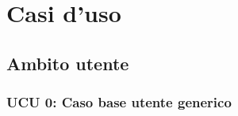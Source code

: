 \section{Casi d'uso}

\iffalse  %
\paragraph{UC 1:}
\begin{itemize}
\item \textbf{Attori:} utente autenticato;
\item \textbf{Descrizione:} 
\item \textbf{Precondizione:} 
\item \textbf{Scenario principale:} 
\begin{itemize}
\item 
\end{itemize}
\item \textbf{Postcondizione:}
\end{itemize}
\fi

\subsection{Ambito utente}

\subsubsection{UCU 0: Caso base utente generico}

